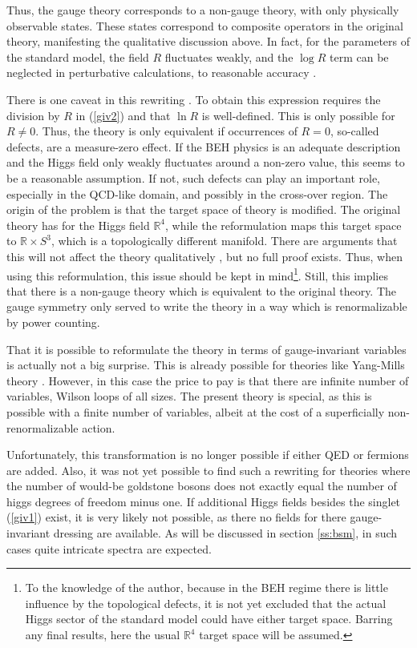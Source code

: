 \documentclass[final,12pt,3p,longtitle]{elsarticle}
\newcommand*{\pref}[1]{(\ref{#1})}
\newcommand*{\1}{1\!\!\!\bot}
\newcommand*{\rn}{\mathbb{R}}
\begin{document}
Thus, the gauge theory corresponds to a non-gauge theory, with only physically observable states. These states correspond to composite operators in the original theory, manifesting the qualitative discussion above. In fact, for the parameters of the standard model, the field $R$ fluctuates weakly, and the $\log R$ term can be neglected in perturbative calculations, to reasonable accuracy \cite{Philipsen:1996af}.

There is one caveat in this rewriting \cite{Maas:2013aia}. To obtain this expression requires the division by $R$ in \pref{giv2} and that $\ln R$ is well-defined. This is only possible for $R\neq 0$. Thus, the theory is only equivalent if occurrences of $R=0$, so-called defects, are a measure-zero effect. If the BEH physics is an adequate description and the Higgs field only weakly fluctuates around a non-zero value, this seems to be a reasonable assumption. If not, such defects can play an important role, especially in the QCD-like domain, and possibly in the cross-over region. The origin of the problem is that the target space of theory is modified. The original theory has for the Higgs field $\rn^4$, while the reformulation maps this target space to $\rn\times S^3$, which is a topologically different manifold. There are arguments that this will not affect the theory qualitatively  \cite{Callaway:1988ya,Kenna:1993fp,Fernandez:1992jh}, but no full proof exists. Thus, when using this reformulation, this issue should be kept in mind\footnote{To the knowledge of the author, because in the BEH regime there is little influence by the topological defects, it is not yet excluded that the actual Higgs sector of the standard model could have either target space. Barring any final results, here the usual $\rn^4$ target space will be assumed.}. Still, this implies that there is a non-gauge theory which is equivalent to the original theory. The gauge symmetry only served to write the theory in a way which is renormalizable by power counting.

That it is possible to reformulate the theory in terms of gauge-invariant variables is actually not a big surprise. This is already possible for theories like Yang-Mills theory \cite{Gambini:1996ik}. However, in this case the price to pay is that there are infinite number of variables, Wilson loops \cite{Gattringer:2010zz} of all sizes. The present theory is special, as this is possible with a finite number of variables, albeit at the cost of a superficially non-renormalizable action.

Unfortunately, this transformation is no longer possible if either QED or fermions are added. Also, it was not yet possible to find such a rewriting for theories where the number of would-be goldstone bosons does not exactly equal the number of higgs degrees of freedom minus one. If additional Higgs fields besides the singlet \pref{giv1} exist, it is very likely not possible, as there no fields for there gauge-invariant dressing are available. As will be discussed in section \ref{ss:bsm}, in such cases quite intricate spectra are expected.
\end{document}
